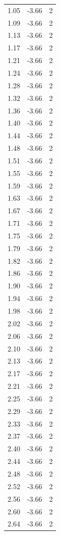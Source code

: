 \begin{longtable}{lrr}
  1.05 & -3.66 & 2 \\
  1.09 & -3.66 & 2 \\
  1.13 & -3.66 & 2 \\
  1.17 & -3.66 & 2 \\
  1.21 & -3.66 & 2 \\
  1.24 & -3.66 & 2 \\
  1.28 & -3.66 & 2 \\
  1.32 & -3.66 & 2 \\
  1.36 & -3.66 & 2 \\
  1.40 & -3.66 & 2 \\
  1.44 & -3.66 & 2 \\
  1.48 & -3.66 & 2 \\
  1.51 & -3.66 & 2 \\
  1.55 & -3.66 & 2 \\
  1.59 & -3.66 & 2 \\
  1.63 & -3.66 & 2 \\
  1.67 & -3.66 & 2 \\
  1.71 & -3.66 & 2 \\
  1.75 & -3.66 & 2 \\
  1.79 & -3.66 & 2 \\
  1.82 & -3.66 & 2 \\
  1.86 & -3.66 & 2 \\
  1.90 & -3.66 & 2 \\
  1.94 & -3.66 & 2 \\
  1.98 & -3.66 & 2 \\
  2.02 & -3.66 & 2 \\
  2.06 & -3.66 & 2 \\
  2.10 & -3.66 & 2 \\
  2.13 & -3.66 & 2 \\
  2.17 & -3.66 & 2 \\
  2.21 & -3.66 & 2 \\
  2.25 & -3.66 & 2 \\
  2.29 & -3.66 & 2 \\
  2.33 & -3.66 & 2 \\
  2.37 & -3.66 & 2 \\
  2.40 & -3.66 & 2 \\
  2.44 & -3.66 & 2 \\
  2.48 & -3.66 & 2 \\
  2.52 & -3.66 & 2 \\
  2.56 & -3.66 & 2 \\
  2.60 & -3.66 & 2 \\
  2.64 & -3.66 & 2 \\

\end{longtable}
